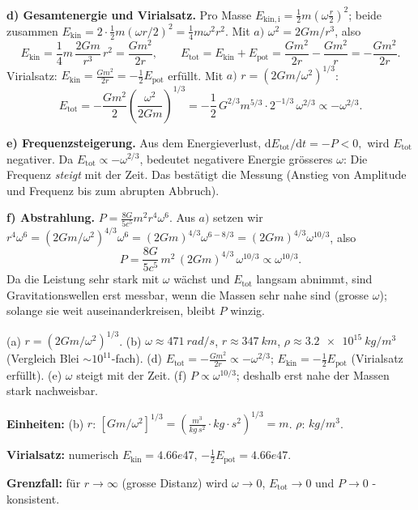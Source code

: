 \textbf{d) Gesamtenergie und Virialsatz.} Pro Masse
$E_\mathrm{kin,i}=\frac12 m (\omega\frac r2)^2$; beide zusammen
$E_\mathrm{kin}=2\cdot\frac12 m (\omega r/2)^2=\frac14 m\omega^2 r^2$. Mit
$a)$ $\omega^2=2Gm/r^3$, also
\begin{equation}
  E_\mathrm{kin} = \frac14 m\,\frac{2Gm}{r^3}\,r^2
  = \frac{Gm^2}{2r},
  \qquad
  E_\mathrm{tot}=E_\mathrm{kin}+E_\mathrm{pot}
  = \frac{Gm^2}{2r}-\frac{Gm^2}{r}
  = -\frac{Gm^2}{2r}.
\end{equation}
Virialsatz: $E_\mathrm{kin}=\frac{Gm^2}{2r}=-\frac12 E_\mathrm{pot}$ erfüllt.
Mit $a)$ $r=(2Gm/\omega^2)^{1/3}$:
\begin{equation}
  E_\mathrm{tot} = -\frac{Gm^2}{2}\left(\frac{\omega^2}{2Gm}\right)^{1/3}
  = -\frac12\,G^{2/3}m^{5/3}\cdot 2^{-1/3}\,\omega^{2/3}
  \propto -\omega^{2/3}.
\end{equation}

\textbf{e) Frequenzsteigerung.} Aus dem Energieverlust,
$
  \mathrm dE_\mathrm{tot}/\mathrm dt = -P < 0,
$
wird $E_\mathrm{tot}$ negativer. Da $E_\mathrm{tot}\propto -\omega^{2/3}$,
bedeutet negativere Energie grösseres $\omega$: Die Frequenz \emph{steigt}
mit der Zeit. Das bestätigt die Messung (Anstieg von Amplitude und Frequenz
bis zum abrupten Abbruch).

\textbf{f) Abstrahlung.} $P=\frac{8G}{5c^5}m^2r^4\omega^6$. Aus $a)$ setzen wir
$r^4\omega^6=(2Gm/\omega^2)^{4/3}\omega^6
=\left(2Gm\right)^{4/3}\omega^{6-8/3}
=\left(2Gm\right)^{4/3}\omega^{10/3}$, also
\begin{equation}
  P = \frac{8G}{5c^5}\,m^2\,(2Gm)^{4/3}\,\omega^{10/3}
  \propto \omega^{10/3}.
\end{equation}
Da die Leistung sehr stark mit $\omega$ wächst und $E_\mathrm{tot}$ langsam
abnimmt, sind Gravitationswellen erst messbar, wenn die Massen sehr nahe sind
(grosse $\omega$); solange sie weit auseinanderkreisen, bleibt $P$ winzig.

\begin{ergebnis}
(a) $r=(2Gm/\omega^2)^{1/3}$.
(b) $\omega\approx\qty{471}{rad/s}$, $r\approx\qty{347}{km}$,
$\rho\approx\qty{3.2e15}{kg/m^3}$ (Vergleich Blei $\sim10^{11}$-fach).
(d) $E_\mathrm{tot}=-\frac{Gm^2}{2r}\propto-\omega^{2/3}$;
$E_\mathrm{kin}=-\frac12 E_\mathrm{pot}$ (Virialsatz erfüllt).
(e) $\omega$ steigt mit der Zeit. (f) $P\propto\omega^{10/3}$; deshalb erst
nahe der Massen stark nachweisbar.
\end{ergebnis}

\begin{kontrolle}
\textbf{Einheiten:} (b) $r$: $[G m/\omega^2]^{1/3}
=\left(\frac{m^3}{kg\,s^2}\cdot kg\cdot s^2\right)^{1/3}=m$. \checkmark
$\rho$: $kg/m^3$. \checkmark

\textbf{Virialsatz:} numerisch $E_\mathrm{kin}=4.66e47$, $-\frac12 E_\mathrm{pot}
=4.66e47$. \checkmark

\textbf{Grenzfall:} für $r\to\infty$ (grosse Distanz) wird $\omega\to0$,
$E_\mathrm{tot}\to0$ und $P\to0$ - konsistent.
\end{kontrolle}

